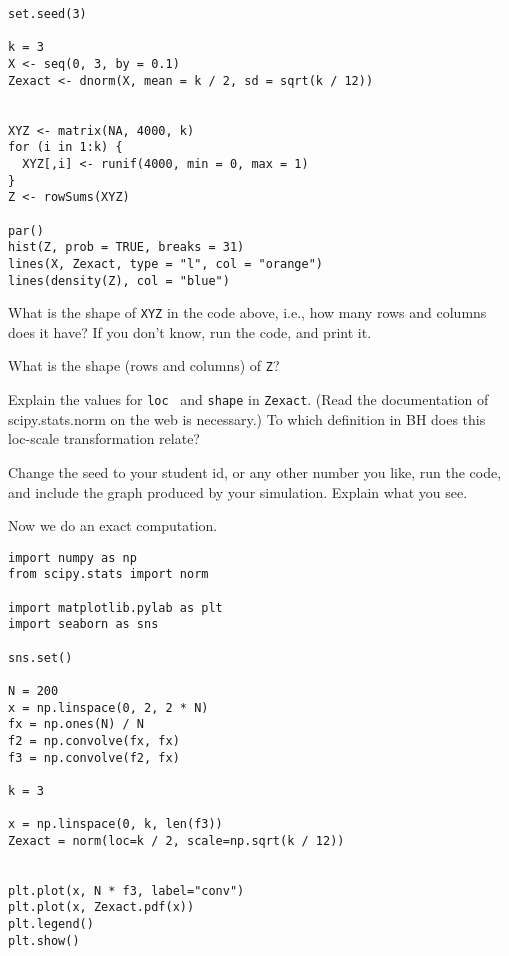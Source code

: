 \documentclass[assignments]{subfiles}
\begin{document}
\begin{verbatim}
set.seed(3)

k = 3
X <- seq(0, 3, by = 0.1)
Zexact <- dnorm(X, mean = k / 2, sd = sqrt(k / 12))


XYZ <- matrix(NA, 4000, k)
for (i in 1:k) {
  XYZ[,i] <- runif(4000, min = 0, max = 1)
}
Z <- rowSums(XYZ)

par()
hist(Z, prob = TRUE, breaks = 31)
lines(X, Zexact, type = "l", col = "orange")
lines(density(Z), col = "blue")
\end{verbatim}


\begin{exercise}
What is the shape of \verb|XYZ| in the code above, i.e., how many rows and columns does it have? If you don't know, run the code, and print it.
\end{exercise}

\begin{exercise}
What is the shape (rows and columns) of \verb|Z|?
\end{exercise}

\begin{exercise}
Explain the values for \verb|loc|~ and \verb|shape| in \verb|Zexact|.
  (Read the documentation of scipy.stats.norm on the web is necessary.)
  To which definition in BH does this loc-scale transformation relate?
\end{exercise}


\begin{exercise}
Change the seed to your student id, or any other number you like, run the code, and include the graph produced by your simulation.
Explain what you see.
\end{exercise}


Now we do an exact computation.

\begin{verbatim}
import numpy as np
from scipy.stats import norm

import matplotlib.pylab as plt
import seaborn as sns

sns.set()

N = 200
x = np.linspace(0, 2, 2 * N)
fx = np.ones(N) / N
f2 = np.convolve(fx, fx)
f3 = np.convolve(f2, fx)

k = 3

x = np.linspace(0, k, len(f3))
Zexact = norm(loc=k / 2, scale=np.sqrt(k / 12))


plt.plot(x, N * f3, label="conv")
plt.plot(x, Zexact.pdf(x))
plt.legend()
plt.show()
\end{verbatim}
\end{document}
